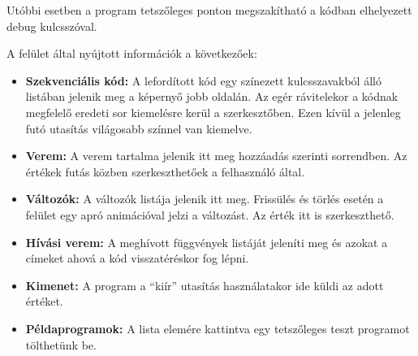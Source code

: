 Utóbbi esetben a program tetszőleges ponton megszakítható a kódban elhelyezett debug kulcsszóval.

A felület által nyújtott információk a következőek:

\begin{itemize}
    \item \textbf{Szekvenciális kód:} A lefordított kód egy színezett kulcsszavakból álló listában jelenik meg a képernyő jobb oldalán. Az egér rávitelekor a kódnak megfelelő eredeti sor kiemelésre kerül a szerkesztőben. Ezen kívül a jelenleg futó utasítás világosabb színnel van kiemelve.
    \item \textbf{Verem:} A verem tartalma jelenik itt meg hozzáadás szerinti sorrendben. Az értékek futás közben szerkeszthetőek a felhasználó által.
    \item \textbf{Változók:} A változók listája jelenik itt meg. Frissülés és törlés esetén a felület egy apró animációval jelzi a változást. Az érték itt is szerkeszthető.
    \item \textbf{Hívási verem:} A meghívott függvények listáját jeleníti meg és azokat a címeket ahová a kód visszatéréskor fog lépni.
    \item \textbf{Kimenet:} A program a “kiír” utasítás használatakor ide küldi az adott értéket.
    \item \textbf{Példaprogramok:} A lista elemére kattintva egy tetszőleges teszt programot tölthetünk be.
\end{itemize}